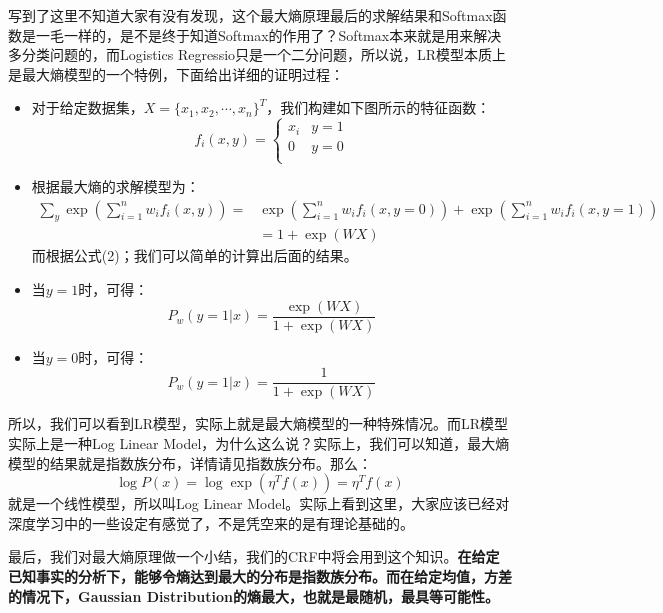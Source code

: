 \documentclass[a4paper]{article}
\begin{document}
写到了这里不知道大家有没有发现，这个最大熵原理最后的求解结果和Softmax函数是一毛一样的，是不是终于知道Softmax的作用了？Softmax本来就是用来解决多分类问题的，而Logistics Regressio只是一个二分问题，所以说，LR模型本质上是最大熵模型的一个特例，下面给出详细的证明过程：
\begin{itemize}
    \item 对于给定数据集，$X=\{ x_1,x_2,\cdots,x_n \}^T$，我们构建如下图所示的特征函数：
    \begin{equation}
    f_i(x,y) = 
    \left\{
    \begin{array}{ll}
      x_i & y=1 \\
      0 & y=0 \\
    \end{array}
    \right.
    \end{equation}
    \item 根据最大熵的求解模型为：
    \begin{equation}
    \begin{split}
         \sum_y \exp \left( \sum_{i=1}^n w_if_i(x,y) \right) = & 
        \exp \left( \sum_{i=1}^n w_if_i(x,y=0) \right) + \exp \left( \sum_{i=1}^n w_if_i(x,y=1) \right) \\
        & = 1+\exp(WX)
    \end{split}
    \end{equation}
    而根据公式(2)；我们可以简单的计算出后面的结果。
    \item 当$y=1$时，可得：
    \begin{equation}
        P_w(y=1|x) = \frac{\exp(WX)}{1+\exp(WX)}
    \end{equation}
    \item 当$y=0$时，可得：
    \begin{equation}
        P_w(y=1|x) = \frac{1}{1+\exp(WX)}
    \end{equation}
\end{itemize}

所以，我们可以看到LR模型，实际上就是最大熵模型的一种特殊情况。而LR模型实际上是一种Log Linear Model，为什么这么说？实际上，我们可以知道，最大熵模型的结果就是指数族分布，详情请见指数族分布。那么：
$$
\log P(x) = \log \exp (\eta^Tf(x)) = \eta^Tf(x)
$$
就是一个线性模型，所以叫Log Linear Model。实际上看到这里，大家应该已经对深度学习中的一些设定有感觉了，不是凭空来的是有理论基础的。

最后，我们对最大熵原理做一个小结，我们的CRF中将会用到这个知识。\textbf{在给定已知事实的分析下，能够令熵达到最大的分布是指数族分布。而在给定均值，方差的情况下，Gaussian Distribution的熵最大，也就是最随机，最具等可能性。}
\end{document}
